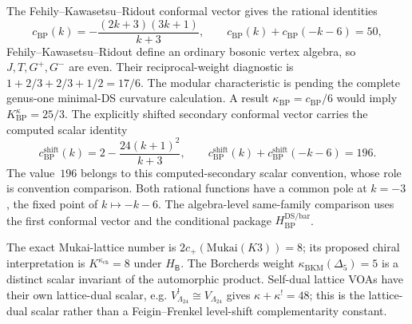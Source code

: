 \begin{remark}
\label{rem:master-bp-convention-separation}
The Fehily--Kawasetsu--Ridout conformal vector gives the rational
identities
\[
c_{\mathrm{BP}}(k)
=-\frac{(2k+3)(3k+1)}{k+3},
\qquad
c_{\mathrm{BP}}(k)+c_{\mathrm{BP}}(-k-6)=50,
\]
Fehily--Kawasetsu--Ridout define an ordinary bosonic vertex algebra,
so $J,T,G^+,G^-$ are even.  Their reciprocal-weight diagnostic is
$1+2/3+2/3+1/2=17/6$.  The modular characteristic is
\ClaimStatusOpen{} pending the complete genus-one minimal-DS curvature
calculation.  A result $\kappa_{\mathrm{BP}}=c_{\mathrm{BP}}/6$
would imply $K^\kappa_{\mathrm{BP}}=25/3$.
The explicitly shifted secondary conformal vector carries the
computed scalar identity
\[
c_{\mathrm{BP}}^{\mathrm{shift}}(k)
=2-\frac{24(k+1)^2}{k+3},
\qquad
c_{\mathrm{BP}}^{\mathrm{shift}}(k)
+c_{\mathrm{BP}}^{\mathrm{shift}}(-k-6)=196.
\]
The value~$196$ belongs to this computed-secondary scalar convention,
whose role is convention comparison.  Both rational functions have a
common pole at $k=-3$, the fixed point of $k\mapsto-k-6$.
The algebra-level same-family comparison uses the first conformal
vector and the conditional package $H_{\mathrm{BP}}^{\mathrm{DS/bar}}$.
\end{remark}

The exact Mukai-lattice number is
$2c_+(\mathrm{Mukai}(K3))=8$; its proposed chiral interpretation is
$K^{\kappa_{\mathrm{ch}}}=8$ under $H_{\mathsf B}$.  The Borcherds
weight $\kappa_{\mathrm{BKM}}(\Delta_5)=5$ is a distinct scalar
invariant of the automorphic product.
Self-dual lattice VOAs have their own lattice-dual scalar, e.g.
$V_{\Lambda_{24}}^!\cong V_{\Lambda_{24}}$ gives
$\kappa+\kappa^!=48$; this is the lattice-dual scalar rather than a
Feigin--Frenkel level-shift complementarity constant.

